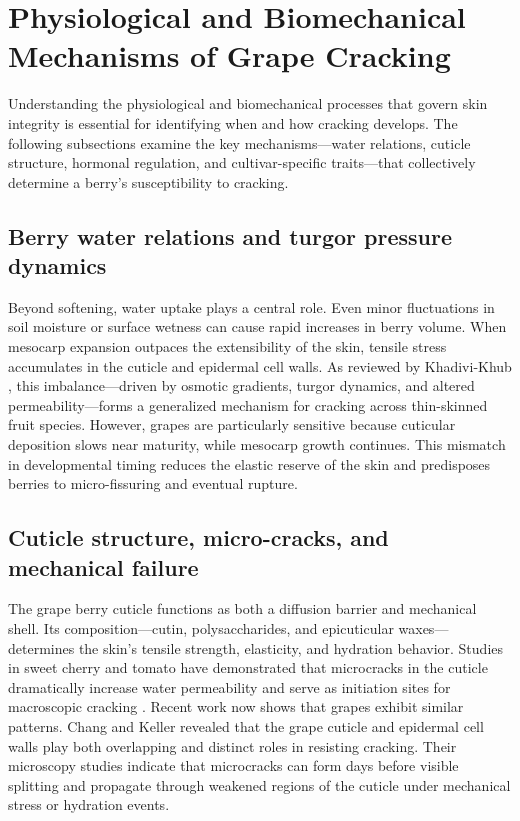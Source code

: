 \section{Physiological and Biomechanical Mechanisms of Grape Cracking}
\label{sec:physiomechanics}

\noindent
Understanding the physiological and biomechanical processes that govern skin integrity is essential for identifying when and how cracking develops. The following subsections examine the key mechanisms---water relations, cuticle structure, hormonal regulation, and cultivar-specific traits---that collectively determine a berry's susceptibility to cracking.


\subsection{Berry water relations and turgor pressure dynamics}

\noindent
Beyond softening, water uptake plays a central role. Even minor fluctuations in soil moisture or
surface wetness can cause rapid increases in berry volume. When mesocarp expansion outpaces
the extensibility of the skin, tensile stress accumulates in the cuticle and epidermal cell walls.
As reviewed by Khadivi-Khub \cite{Khadivi2014}, this imbalance—driven by osmotic gradients,
turgor dynamics, and altered permeability—forms a generalized mechanism for cracking across
thin-skinned fruit species. However, grapes are particularly sensitive because cuticular deposition slows
near maturity, while mesocarp growth continues. This mismatch in developmental timing reduces the
elastic reserve of the skin and predisposes berries to micro-fissuring and eventual rupture.

\subsection{Cuticle structure, micro-cracks, and mechanical failure}

\noindent
The grape berry cuticle functions as both a diffusion barrier and mechanical shell.
Its composition—cutin, polysaccharides, and epicuticular waxes—determines the skin’s tensile strength,
elasticity, and hydration behavior. Studies in sweet cherry and tomato have demonstrated that
microcracks in the cuticle dramatically increase water permeability and serve as initiation sites for
macroscopic cracking \cite{Peschel2005,Emmons1998}. Recent work now shows that grapes exhibit similar
patterns. Chang and Keller \cite{Chang2021} revealed that the grape cuticle and epidermal cell walls play
both overlapping and distinct roles in resisting cracking. Their microscopy studies indicate that
microcracks can form days before visible splitting and propagate through weakened regions of the cuticle
under mechanical stress or hydration events.

